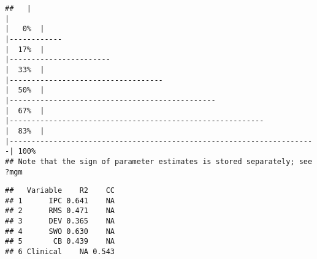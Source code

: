 \documentclass[
]{article}
\newenvironment{Shaded}{\begin{snugshade}}{\end{snugshade}}
\newcommand{\CommentTok}[1]{\textcolor[rgb]{0.56,0.35,0.01}{\textit{#1}}}
\newcommand{\DataTypeTok}[1]{\textcolor[rgb]{0.13,0.29,0.53}{#1}}
\newcommand{\DecValTok}[1]{\textcolor[rgb]{0.00,0.00,0.81}{#1}}
\newcommand{\KeywordTok}[1]{\textcolor[rgb]{0.13,0.29,0.53}{\textbf{#1}}}
\newcommand{\NormalTok}[1]{#1}
\newcommand{\OperatorTok}[1]{\textcolor[rgb]{0.81,0.36,0.00}{\textbf{#1}}}
\newcommand{\StringTok}[1]{\textcolor[rgb]{0.31,0.60,0.02}{#1}}
\begin{document}
\begin{verbatim}
##   |                                                                              |                                                                      |   0%  |                                                                              |------------                                                          |  17%  |                                                                              |-----------------------                                               |  33%  |                                                                              |-----------------------------------                                   |  50%  |                                                                              |-----------------------------------------------                       |  67%  |                                                                              |----------------------------------------------------------            |  83%  |                                                                              |----------------------------------------------------------------------| 100%
## Note that the sign of parameter estimates is stored separately; see ?mgm
\end{verbatim}

\begin{Shaded}
\end{Shaded}

\begin{verbatim}
##   Variable    R2    CC
## 1      IPC 0.641    NA
## 2      RMS 0.471    NA
## 3      DEV 0.365    NA
## 4      SWO 0.630    NA
## 5       CB 0.439    NA
## 6 Clinical    NA 0.543
\end{verbatim}

\begin{Shaded}
\end{Shaded}
\end{document}
